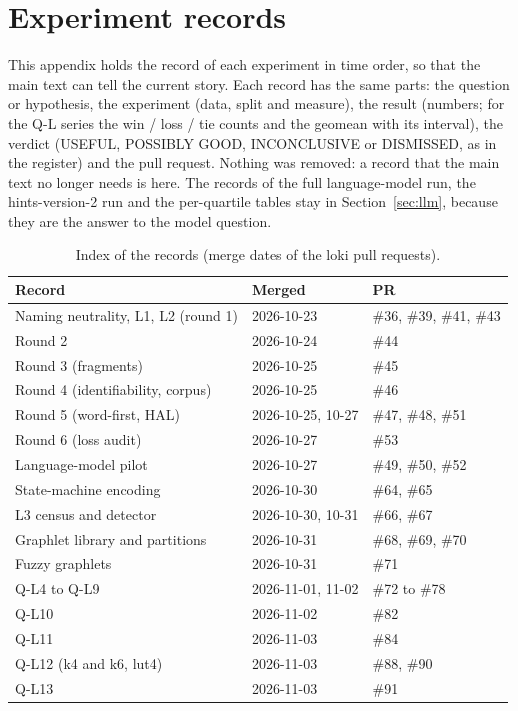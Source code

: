 \documentclass[conference]{IEEEtran}
\begin{document}
\appendices
\makeatletter
\newcommand\lokiAlph[1]{\ifnum#1>26 A\@Alph{\numexpr#1-26\relax}\else\@Alph{#1}\fi}
\def\thesubsection{\mbox{\thesection-\lokiAlph{\value{subsection}}}}
\def\thesubsectiondis{\lokiAlph{\value{subsection}}.}
\makeatother

\section{Experiment records}
\label{app:records}

This appendix holds the record of each experiment in time order, so that the main text can tell the
current story. Each record has the same parts: the question or hypothesis, the experiment (data,
split and measure), the result (numbers; for the Q-L series the win / loss / tie counts and the geomean
with its interval), the verdict (USEFUL, POSSIBLY GOOD, INCONCLUSIVE or DISMISSED, as in the register) and the
pull request. Nothing was removed: a record that the main text no longer needs is here. The records of the
full language-model run, the hints-version-2 run and the per-quartile tables stay in
Section~\ref{sec:llm}, because they are the answer to the model question.

\begin{table}[t]
\caption{Index of the records (merge dates of the loki pull requests).}
\label{tab:records}
\centering
\footnotesize
\begin{tabular}{@{}p{}p{}p{}@{}}
\toprule
Record & Merged & PR \\
\midrule
Naming neutrality, L1, L2 (round 1) & 2026-10-23 & \#36, \#39, \#41, \#43 \\
Round 2 & 2026-10-24 & \#44 \\
Round 3 (fragments) & 2026-10-25 & \#45 \\
Round 4 (identifiability, corpus) & 2026-10-25 & \#46 \\
Round 5 (word-first, HAL) & 2026-10-25, 10-27 & \#47, \#48, \#51 \\
Round 6 (loss audit) & 2026-10-27 & \#53 \\
Language-model pilot & 2026-10-27 & \#49, \#50, \#52 \\
State-machine encoding & 2026-10-30 & \#64, \#65 \\
L3 census and detector & 2026-10-30, 10-31 & \#66, \#67 \\
Graphlet library and partitions & 2026-10-31 & \#68, \#69, \#70 \\
Fuzzy graphlets & 2026-10-31 & \#71 \\
Q-L4 to Q-L9 & 2026-11-01, 11-02 & \#72 to \#78 \\
Q-L10 & 2026-11-02 & \#82 \\
Q-L11 & 2026-11-03 & \#84 \\
Q-L12 (k4 and k6, lut4) & 2026-11-03 & \#88, \#90 \\
Q-L13 & 2026-11-03 & \#91 \\
\bottomrule
\end{tabular}
\end{table}
\end{document}

